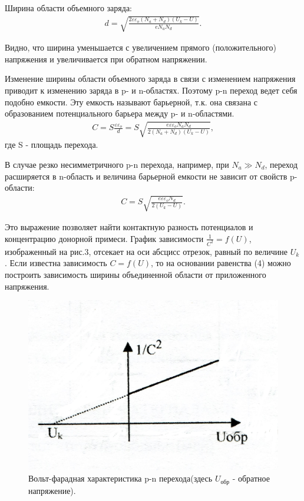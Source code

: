 Ширина области объемного заряда:
\begin{gather}
	d=\sqrt{\frac{2\varepsilon \varepsilon_o(N_a+N_d)(U_k-U)}{eN_aN_d}}.
\end{gather} 

Видно, что ширина уменьшается с увеличением прямого (положительного) напряжения и увеличивается при обратном напряжении.

Изменение ширины области объемного заряда в связи с изменением напряжения приводит к изменению заряда в p- и n-областях. Поэтому p-n переход ведет себя подобно емкости. Эту емкость называют барьерной, т.к. она связана с образованием потенциального барьера между p- и n-областями. 
\begin{gather}
	C=S\frac{\varepsilon \varepsilon_o}{d}=S\sqrt{\frac{e\varepsilon \varepsilon_oN_aN_d}{2(N_a+N_d)(U_k-U)}},
\end{gather}
где S - площадь перехода.

В случае резко несимметричного p-n перехода, например, при $N_a \gg N_d$, переход расширяется в n-область и величина барьерной емкости не зависит от свойств p-области:
\begin{gather}
	C=S\sqrt{\frac{e\varepsilon \varepsilon_oN_d}{2(U_k-U)}}.
\end{gather}

Это выражение позволяет найти контактную разность потенциалов и концентрацию донорной примеси. График зависимости $\frac{1}{C^2}=f(U)$, изображенный на рис.3, отсекает на оси абсцисс отрезок, равный по величине $U_k$. Если известна зависимость $C=f(U)$, то на основании равенства (4) можно построить зависимость ширины объединенной области от приложенного напряжения.
\begin{figure}[h!]
	\centering
	\includegraphics[width=0.5\linewidth]{imgs/fig3.jpg}
	\caption{Вольт-фарадная характеристика p-n перехода(здесь $U_{\text{обр}}$ - обратное напряжение).}
	\label{fig:3}
\end{figure}


